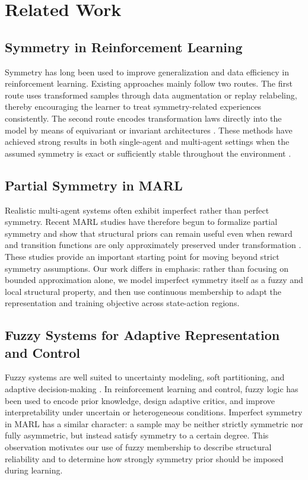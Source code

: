 \documentclass[lettersize,journal]{IEEEtran}
\begin{document}
\section{Related Work}
\subsection{Symmetry in Reinforcement Learning}
Symmetry has long been used to improve generalization and data efficiency in reinforcement learning. Existing approaches mainly follow two routes. The first route uses transformed samples through data augmentation or replay relabeling, thereby encouraging the learner to treat symmetry-related experiences consistently. The second route encodes transformation laws directly into the model by means of equivariant or invariant architectures \cite{vanderpol2020,wang2022}. These methods have achieved strong results in both single-agent and multi-agent settings when the assumed symmetry is exact or sufficiently stable throughout the environment \cite{vanderpol2021}.

\subsection{Partial Symmetry in MARL}
Realistic multi-agent systems often exhibit imperfect rather than perfect symmetry. Recent MARL studies have therefore begun to formalize partial symmetry and show that structural priors can remain useful even when reward and transition functions are only approximately preserved under transformation \cite{partialsym2024}. These studies provide an important starting point for moving beyond strict symmetry assumptions. Our work differs in emphasis: rather than focusing on bounded approximation alone, we model imperfect symmetry itself as a fuzzy and local structural property, and then use continuous membership to adapt the representation and training objective across state-action regions.

\subsection{Fuzzy Systems for Adaptive Representation and Control}
Fuzzy systems are well suited to uncertainty modeling, soft partitioning, and adaptive decision-making \cite{zadeh1965,takagisugeno1985,wangbook}. In reinforcement learning and control, fuzzy logic has been used to encode prior knowledge, design adaptive critics, and improve interpretability under uncertain or heterogeneous conditions. Imperfect symmetry in MARL has a similar character: a sample may be neither strictly symmetric nor fully asymmetric, but instead satisfy symmetry to a certain degree. This observation motivates our use of fuzzy membership to describe structural reliability and to determine how strongly symmetry prior should be imposed during learning.
\end{document}
